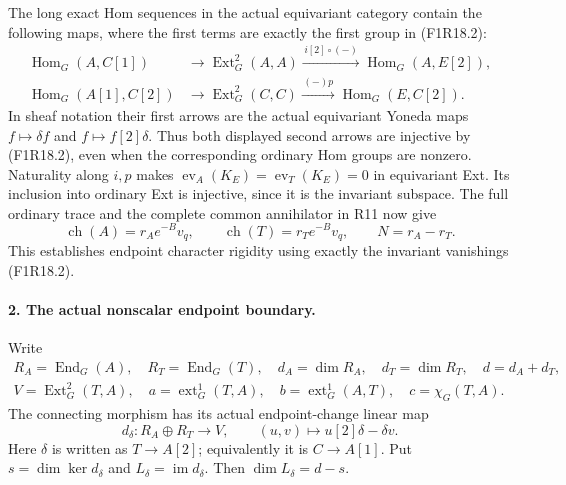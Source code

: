 The long exact Hom sequences in the actual equivariant
category contain the following maps, where the first
terms are exactly the first group in (F1R18.2):
\[
 \begin{aligned}
 \operatorname{Hom}_G(A,C[1])&\longrightarrow
 \operatorname{Ext}^2_G(A,A)
       \xrightarrow{\,i[2]\circ(-)\,}\operatorname{Hom}_G(A,E[2]),\\
 \operatorname{Hom}_G(A[1],C[2])&\longrightarrow
 \operatorname{Ext}^2_G(C,C)
       \xrightarrow{\,(-)p\,}\operatorname{Hom}_G(E,C[2]).
 \end{aligned}
 \tag{F1R18.4}
\]
In sheaf notation their first arrows are the actual
equivariant Yoneda maps
$f\mapsto\delta f$ and $f\mapsto f[2]\delta$.
Thus both displayed second arrows are injective by
(F1R18.2), even when the corresponding ordinary Hom
groups are nonzero. Naturality along $i,p$ makes
$\operatorname{ev}_A(K_E)=\operatorname{ev}_T(K_E)=0$
in equivariant Ext. Its inclusion into ordinary Ext is
injective, since it is the invariant subspace. The full
ordinary trace and the complete common annihilator in
R11 now give
\[
       \operatorname{ch}(A)=r_Ae^{-B}v_q,\qquad
       \operatorname{ch}(T)=r_Te^{-B}v_q,
                       \qquad N=r_A-r_T.
 \tag{F1R18.5}
\]
This establishes endpoint character rigidity using
exactly the invariant vanishings (F1R18.2).

\paragraph{2. The actual nonscalar endpoint boundary.}
Write
\[
 \begin{gathered}
 R_A=\operatorname{End}_G(A),\quad
 R_T=\operatorname{End}_G(T),\quad
 d_A=\dim R_A,\quad d_T=\dim R_T,\quad d=d_A+d_T,\\
 V=\operatorname{Ext}^2_G(T,A),\quad
 a=\operatorname{ext}^1_G(T,A),\quad
 b=\operatorname{ext}^1_G(A,T),\quad c=\chi_G(T,A).
 \end{gathered}
 \tag{F1R18.6}
\]
The connecting morphism has its actual endpoint-change
linear map
\[
 d_\delta:R_A\oplus R_T\longrightarrow V,\qquad
               (u,v)\longmapsto u[2]\delta-\delta v.
 \tag{F1R18.7}
\]
Here $\delta$ is written as $T\to A[2]$; equivalently
it is $C\to A[1]$. Put
$s=\dim\ker d_\delta$ and $L_\delta=\operatorname{im}d_\delta$.
Then $\dim L_\delta=d-s$.

